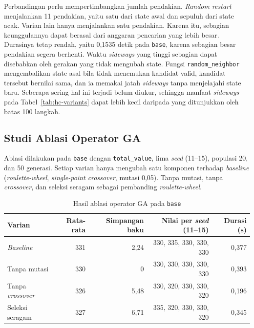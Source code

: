 Perbandingan perlu mempertimbangkan jumlah pendakian. \textit{Random restart} menjalankan 11 pendakian, yaitu satu dari state awal dan sepuluh dari state acak. Varian lain hanya menjalankan satu pendakian. Karena itu, sebagian keunggulannya dapat berasal dari anggaran pencarian yang lebih besar. Durasinya tetap rendah, yaitu 0,1535 detik pada \texttt{base}, karena sebagian besar pendakian segera berhenti. Waktu \textit{sideways} yang tinggi sebagian dapat disebabkan oleh gerakan yang tidak mengubah state. Fungsi \texttt{random\_neighbor} mengembalikan state asal bila tidak menemukan kandidat valid, kandidat tersebut bernilai sama, dan ia memakai jatah \textit{sideways} tanpa menjelajahi state baru. Seberapa sering hal ini terjadi belum diukur, sehingga manfaat \textit{sideways} pada Tabel~\ref{tab:hc-variants} dapat lebih kecil daripada yang ditunjukkan oleh batas 100 langkah.

\subsection{Studi Ablasi Operator GA}

Ablasi dilakukan pada \texttt{base} dengan \texttt{total\_value}, lima \textit{seed} (11--15), populasi 20, dan 50 generasi. Setiap varian hanya mengubah satu komponen terhadap \textit{baseline} (\textit{roulette-wheel}, \textit{single-point crossover}, mutasi 0,05). Tanpa mutasi, tanpa \textit{crossover}, dan seleksi seragam sebagai pembanding \textit{roulette-wheel}.

\begin{table}[H]
    \centering
    \begin{tabular}{@{}lrrrr@{}}
        \toprule
        Varian                   & Rata-rata & Simpangan baku & Nilai per \textit{seed} (11--15) & Durasi (s) \\
        \midrule
        \textit{Baseline}        & 331       & 2,24           & 330, 335, 330, 330, 330          & 0,377      \\
        Tanpa mutasi             & 330       & 0              & 330, 330, 330, 330, 330          & 0,393      \\
        Tanpa \textit{crossover} & 326       & 5,48           & 330, 320, 330, 330, 320          & 0,196      \\
        Seleksi seragam          & 327       & 6,71           & 335, 320, 330, 330, 320          & 0,345      \\
        \bottomrule
    \end{tabular}
    \caption{Hasil ablasi operator GA pada \texttt{base}}
    \label{tab:ablasi}
\end{table}

